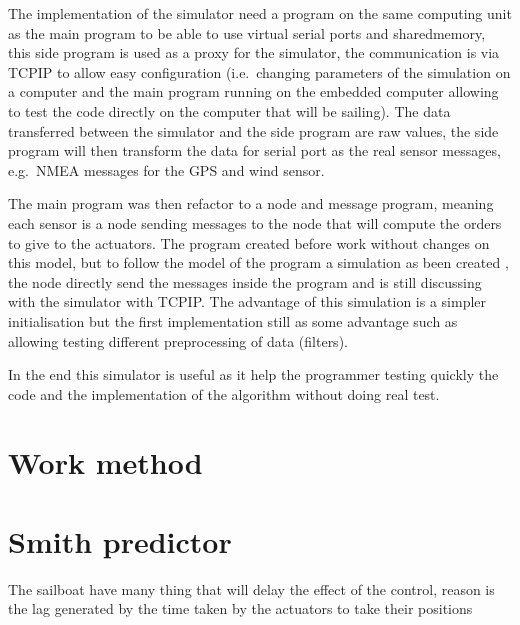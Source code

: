 The implementation of the simulator need a program on the same computing unit as the main program to be able to use virtual serial ports and \gls{sharedmemory}, this side program is used as a proxy for the simulator, the communication is via \gls{TCPIP} to allow easy configuration (i.e.\ changing parameters of the simulation on a computer and the main program running on the embedded computer allowing to test the code directly on the computer that will be sailing).
The data transferred between the simulator and the side program are raw values, the side program will 
then transform the data for serial port as the real sensor messages, e.g.\ \gls{NMEA} messages for the GPS and 
wind sensor.

The main program was then refactor to a node and message program, meaning each sensor is a node sending messages to the node that will compute the orders to give to the actuators. The program created before work without changes on this model, but to follow the model of the program a simulation as been created , the node directly send the messages inside the program and is still discussing with the simulator with \gls{TCPIP}.
The advantage of this simulation is a simpler initialisation but the first implementation still as some advantage such as allowing testing different preprocessing of data (filters).

In the end this simulator is useful as it help the programmer testing quickly the code and the implementation of the algorithm without doing real test.


\section{Work method}

\section{Smith predictor}

The sailboat have many thing that will delay the effect of the control,
reason is the lag generated by the time taken by the actuators to take their positions

